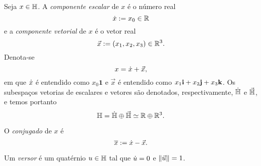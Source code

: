 %

\begin{definition}
Seja $x \in \mathbb{H}$. A \emph{componente escalar} de $x$ é o número real
	\begin{equation*}
	\dot{x} := x_0 \in \mathbb{R}
	\end{equation*}
e a \emph{componente vetorial} de $x$ é o vetor real
	\begin{equation*}
	\vec{x} := (x_1,x_2,x_3) \in \mathbb{R}^3.
	\end{equation*}
Denota-se
	\begin{equation*}
	x = \dot{x} + \vec{x},
	\end{equation*}
em que $\dot{x}$ é entendido como $x_0 \bm 1$ e $\vec{x}$ é entendido como $x_1\bm {\mathrm{i}} + x_2 \bm{\mathrm{j}} + x_3 \bm {\mathrm{k}}$. Os subespaços vetorias de escalares e vetores são denotados, respectivamente, $\dot{\mathbb{H}}$ e $\vec{\mathbb{H}}$, e temos portanto
	\begin{equation*}
	\mathbb{H} = \dot{\mathbb{H}} \oplus \vec{\mathbb{H}} \simeq \mathbb{R} \oplus \mathbb{R}^3.
	\end{equation*}

O \emph{conjugado} de $x$ é
	\begin{equation*}
	\overline{x} := \dot{x}-\vec{x}.
	\end{equation*}

Um \emph{versor} é um quatérnio $u \in \mathbb{H}$ tal que $\dot{u}=0$ e $\left\Vert{\vec{u}}\right\Vert=1$.
\end{definition}

